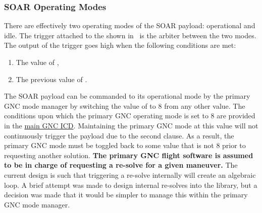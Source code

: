 \documentclass[10pt]{article}
\begin{document}
\subsubsection{SOAR Operating Modes}\label{sec3:op_modes}
There are effectively two operating modes of the SOAR payload: operational and idle. The trigger attached to the  shown in~ is the arbiter between the two modes. The output of the trigger goes high when the following conditions are met:
\begin{enumerate}
\item The value of ,
\item The previous value of .
\end{enumerate}
The SOAR payload can be commanded to its operational mode by the primary GNC mode manager by switching the value of  to $8$ from any other value. The conditions upon which the primary GNC operating mode is set to $8$ are provided in the \href{https://drive.google.com/open?id=1wTjmsQdXGk9jmEHy59fZAdBJJ3r1IE4LGFjHT2S5png}{main GNC ICD}. Maintaining the primary GNC mode at this value will not continuously trigger the payload due to the second clause. As a result, the primary GNC mode must be toggled back to some value that is not $8$ prior to requesting another solution. \textbf{The primary GNC flight software is assumed to be in charge of requesting a re-solve for a given maneuver.} The current design is such that triggering a re-solve internally will create an algebraic loop. A brief attempt was made to design internal re-solves into the library, but a decision was made that it would be simpler to manage this within the primary GNC mode manager. 



\end{document}
